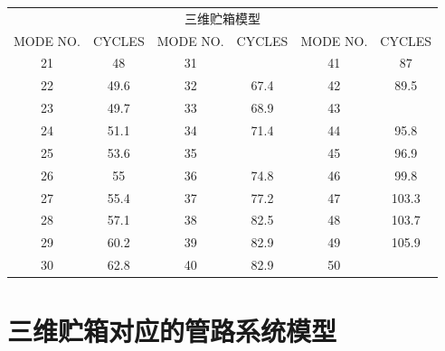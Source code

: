 \begin{table}[htbp]
	\centering
	\begin{minipage}[t]{\linewidth}
	\begin{tabular}{cccccc}
		\toprule
		\multicolumn{6}{c}{三维贮箱模型} \\
		\cmidrule{1-6}
		MODE NO. & CYCLES & MODE NO. & CYCLES & MODE NO. & CYCLES \\
		\midrule
		21    & 48    & 31    & \framebox{\textcolor{red}{63.8}}  & 41    & 87 \\
		22    & 49.6  & 32    & 67.4  & 42    & 89.5 \\
		23    & 49.7  & 33    & 68.9  & 43    & \framebox{\textcolor{red}{91.2}} \\
		24    & 51.1  & 34    & 71.4  & 44    & 95.8 \\
		25    & 53.6  & 35    & \framebox{\textcolor{red}{73.1}}  & 45    & 96.9 \\
		26    & 55    & 36    & 74.8  & 46    & 99.8 \\
		27    & 55.4  & 37    & 77.2  & 47    & 103.3 \\
		28    & 57.1  & 38    & 82.5  & 48    & 103.7 \\
		29    & 60.2  & 39    & 82.9  & 49    & 105.9 \\
		30    & 62.8  & 40    & 82.9  & 50    & \framebox{\textcolor{red}{108.2}} \\
		\bottomrule
	\end{tabular}
	\end{minipage}
	\label{table:Liquid-Rocket-Structural-System-Eigen}
\end{table}

\section{三维贮箱对应的管路系统模型}
\label{sec:3D-Tank-VS-Feedline-Update}

